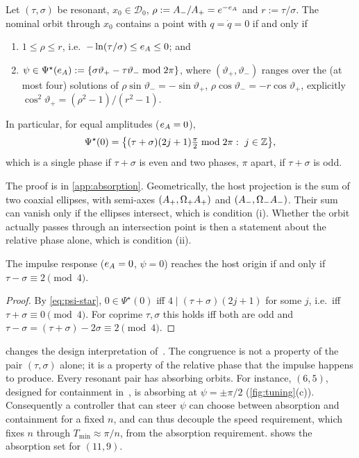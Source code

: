 \begin{theorem}\label{thm:absorption}
Let $(\tau,\sigma)$ be resonant, $x_0\in\mathcal D_0$, $\rho:=A_-/A_+=e^{-e_A}$
and $r:=\tau/\sigma$.
The nominal orbit through $x_0$ contains a point with $q=\dot q=0$ if and only if
\begin{enumerate}
\item[(i)] $1\le\rho\le r$, i.e.\ $-\ln(\tau/\sigma)\le e_A\le0$; and
\item[(ii)] $\psi\in\Psi^\star(e_A):=\{\sigma\vartheta_+-\tau\vartheta_- \bmod
  2\pi\}$, where $(\vartheta_+,\vartheta_-)$ ranges over the (at most four)
  solutions of $\rho\sin\vartheta_-=-\sin\vartheta_+$,
  $\rho\cos\vartheta_-=-r\cos\vartheta_+$, explicitly
  $\cos^2\vartheta_+=(\rho^2-1)/(r^2-1)$.
\end{enumerate}
In particular, for equal amplitudes ($e_A=0$),
\begin{equation}\label{eq:psi-star}
  \Psi^\star(0)=\big\{(\tau+\sigma)(2j+1)\tfrac{\pi}{2}\bmod 2\pi:\ j\in\ZZ\big\},
\end{equation}
which is a single phase if $\tau+\sigma$ is even and two phases, $\pi$ apart, if
$\tau+\sigma$ is odd.
\end{theorem}

The proof is in \cref{app:absorption}.
Geometrically, the host projection is the sum of two coaxial ellipses, with
semi-axes $(A_+,\Omega_+ A_+)$ and $(A_-,\Omega_- A_-)$.
Their sum can vanish only if the ellipses intersect, which is condition (i).
Whether the orbit actually passes through an intersection point is then a
statement about the relative phase alone, which is condition (ii).

\begin{corollary}
\label{cor:mod4}
The impulse response ($e_A=0$, $\psi=0$) reaches the host origin if and only if
$\tau-\sigma\equiv2\pmod4$.
\end{corollary}
\begin{proof}
By \eqref{eq:psi-star}, $0\in\Psi^\star(0)$ iff $4\mid(\tau+\sigma)(2j+1)$ for
some $j$, i.e.\ iff $\tau+\sigma\equiv0\pmod4$.
For coprime $\tau,\sigma$ this holds iff both are odd and
$\tau-\sigma=(\tau+\sigma)-2\sigma\equiv2\pmod4$.
\end{proof}

 changes the design interpretation of~\citet{juchem2026shaping}.
The congruence is not a property of the pair $(\tau,\sigma)$ alone; it is a
property of the relative phase that the impulse happens to produce.
Every resonant pair has absorbing orbits.
For instance, $(6,5)$, designed for containment in~\citet{juchem2026shaping}, is
absorbing at $\psi=\pm\pi/2$ (\cref{fig:tuning}(c)).
Consequently a controller that can steer $\psi$ can choose between absorption and
containment for a fixed $n$, and can thus decouple the speed requirement, which
fixes $n$ through $T_{\min}\approx\pi/n$, from the absorption requirement.
 shows the absorption set for $(11,9)$.

